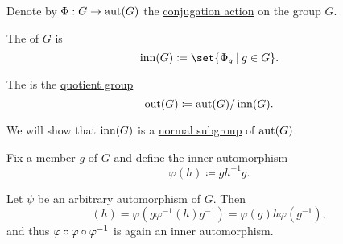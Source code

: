 \begin{definition}\label{def:inner_and_outer_automorphisms}
  Denote by \( \Phi: G \to \operatorname{aut}(G) \) the \hyperref[thm:group_conjugation_action]{conjugation action} on the group \( G \).

  The  of \( G \) is
  \begin{equation*}
    \op{inn}(G) \coloneqq \set{ \Phi_g \given g \in G }.
  \end{equation*}

  The  is the \hyperref[def:quotient_group]{quotient group}
  \begin{equation*}
    \operatorname{out}(G) \coloneqq \operatorname{aut}(G) / \operatorname{inn}(G).
  \end{equation*}
\end{definition}
\begin{defproof}
  We will show that \( \operatorname{inn}(G) \) is a \hyperref[def:normal_subgroup]{normal subgroup} of \( \operatorname{aut}(G) \).

  Fix a member \( g \) of \( G \) and define the inner automorphism
  \begin{equation*}
    \varphi(h) \coloneqq gh^{-1}g.
  \end{equation*}

  Let \( \psi \) be an arbitrary automorphism of \( G \). Then
  \begin{equation*}
    [\varphi \bincirc \varphi \bincirc \varphi^{-1}](h)
    =
    \varphi(g \varphi^{-1}(h) g^{-1})
    =
    \varphi(g) h \varphi(g^{-1}),
  \end{equation*}
  and thus \( \varphi \bincirc \varphi \bincirc \varphi^{-1} \) is again an inner automorphism.
\end{defproof}

